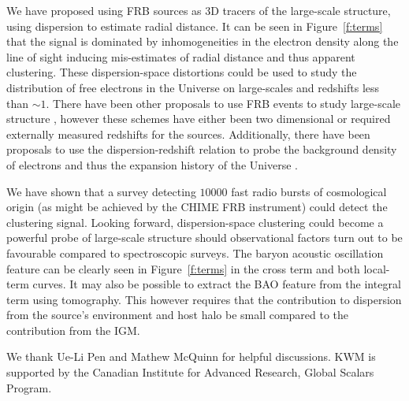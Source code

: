 \documentclass[twocolumn,prl,nofootinbib,floatfix]{revtex4-1}
\begin{document}
We have proposed using FRB sources as 3D tracers of the large-scale structure,
using dispersion to estimate radial distance. It can be seen in
Figure~\ref{f:terms} that the signal is dominated by inhomogeneities in the
electron density along the line of sight inducing mis-estimates of radial
distance and thus apparent clustering. These dispersion-space distortions could be used
to study the distribution of free electrons in the Universe on large-scales and
redshifts less than $\sim\!\!1$.
There have been other proposals to use FRB events to study large-scale
structure \citep{2014ApJ...780L..33M,2014MNRAS.443L..11D}, however these
schemes have either been two dimensional or required externally measured redshifts
for the sources. Additionally, there have been proposals to use the dispersion-redshift
relation to probe the background density of electrons and thus the expansion
history of the Universe
\citep{2014ApJ...783L..35D,2014PhRvD..89j7303Z,2014ApJ...788..189G}.

We have
shown that a survey detecting $10000$ fast radio bursts of cosmological
origin (as might be achieved by the CHIME FRB instrument) could detect the
clustering signal.
Looking forward, dispersion-space
clustering could become a powerful probe of large-scale structure should
observational factors turn out to be favourable compared to spectroscopic
surveys. The baryon acoustic oscillation feature can be clearly seen in
Figure~\ref{f:terms} in the cross term and both
local-term curves. It may also be possible to extract the BAO feature
from the integral
term using tomography.
This however requires that the contribution to dispersion from
the source's environment and host halo be small compared to the
contribution from the IGM.


\begin{acknowledgments}

We thank Ue-Li Pen and Mathew McQuinn for helpful discussions.
%
KWM is supported by the Canadian Institute for Advanced Research, Global Scalars
Program.

\end{acknowledgments}




\end{document}
